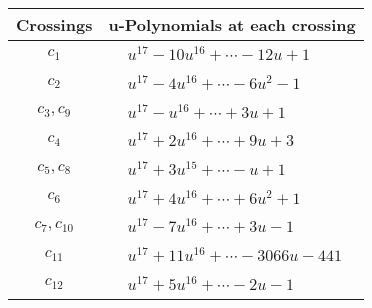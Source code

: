 \documentclass[1p]{elsarticle_modified}
\theoremstyle{definition}
\begin{document}
\begin{tabular}{m{50pt}|m{274pt}}
Crossings & \hspace{64pt}u-Polynomials at each crossing \\
\hline $$\begin{aligned}c_{1}\end{aligned}$$&$\begin{aligned}
&u^{17}-10 u^{16}+\cdots-12 u+1
\end{aligned}$\\
\hline $$\begin{aligned}c_{2}\end{aligned}$$&$\begin{aligned}
&u^{17}-4 u^{16}+\cdots-6 u^2-1
\end{aligned}$\\
\hline $$\begin{aligned}c_{3},c_{9}\end{aligned}$$&$\begin{aligned}
&u^{17}- u^{16}+\cdots+3 u+1
\end{aligned}$\\
\hline $$\begin{aligned}c_{4}\end{aligned}$$&$\begin{aligned}
&u^{17}+2 u^{16}+\cdots+9 u+3
\end{aligned}$\\
\hline $$\begin{aligned}c_{5},c_{8}\end{aligned}$$&$\begin{aligned}
&u^{17}+3 u^{15}+\cdots- u+1
\end{aligned}$\\
\hline $$\begin{aligned}c_{6}\end{aligned}$$&$\begin{aligned}
&u^{17}+4 u^{16}+\cdots+6 u^2+1
\end{aligned}$\\
\hline $$\begin{aligned}c_{7},c_{10}\end{aligned}$$&$\begin{aligned}
&u^{17}-7 u^{16}+\cdots+3 u-1
\end{aligned}$\\
\hline $$\begin{aligned}c_{11}\end{aligned}$$&$\begin{aligned}
&u^{17}+11 u^{16}+\cdots-3066 u-441
\end{aligned}$\\
\hline $$\begin{aligned}c_{12}\end{aligned}$$&$\begin{aligned}
&u^{17}+5 u^{16}+\cdots-2 u-1
\end{aligned}$\\
\hline
\end{tabular}\\~\\
\end{document}
